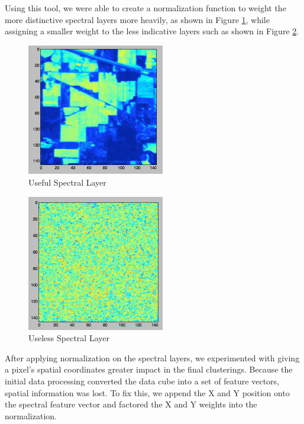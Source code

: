 \documentclass[journal]{IEEEtran}
\begin{document}
    Using this tool, we were able to create a normalization function to weight the more distinctive spectral layers more heavily, as shown in Figure \ref{fig:GoodLayer}, while assigning a smaller weight to the less indicative layers such as shown in Figure \ref{fig:BadLayer}.\\


    \begin{figure}[h!]
      \centering\includegraphics[width=6cm]{images/allStarSpec.png}
      \caption{Useful Spectral Layer}
      \label{fig:GoodLayer}
    \end{figure}

    \begin{figure}[h!]
      \centering\includegraphics[width=6cm]{images/horribleSpec.png}
      \caption{Useless Spectral Layer}
      \label{fig:BadLayer}
    \end{figure}

    After applying normalization on the spectral layers, we experimented with giving a pixel’s spatial coordinates greater impact in the final clusterings. Because the initial data processing converted the data cube into a set of feature vectors, spatial information was lost. To fix this, we append the X and Y position onto the spectral feature vector and factored the X and Y weights into the normalization.\\
\end{document}
